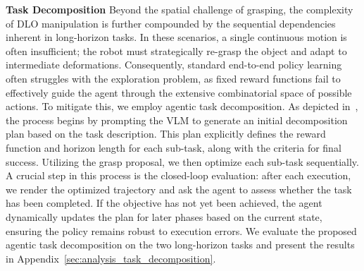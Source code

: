 \textbf{Task Decomposition} Beyond the spatial challenge of grasping, the complexity of DLO manipulation is further compounded by the sequential dependencies inherent in long-horizon tasks. In these scenarios, a single continuous motion is often insufficient; the robot must strategically re-grasp the object and adapt to intermediate deformations. Consequently, standard end-to-end policy learning often struggles with the exploration problem, as fixed reward functions fail to effectively guide the agent through the extensive combinatorial space of possible actions. To mitigate this, we employ agentic task decomposition. As depicted in~, the process begins by prompting the VLM to generate an initial decomposition plan based on the task description. This plan explicitly defines the reward function and horizon length for each sub-task, along with the criteria for final success. Utilizing the grasp proposal, we then optimize each sub-task sequentially.
A crucial step in this process is the closed-loop evaluation: after each execution, we render the optimized trajectory and ask the agent to assess whether the task has been completed. If the objective has not yet been achieved, the agent dynamically updates the plan for later phases based on the current state, ensuring the policy remains robust to execution errors. We evaluate the proposed agentic task decomposition on the two long-horizon tasks and present the results in Appendix~\ref{sec:analysis_task_decomposition}. 